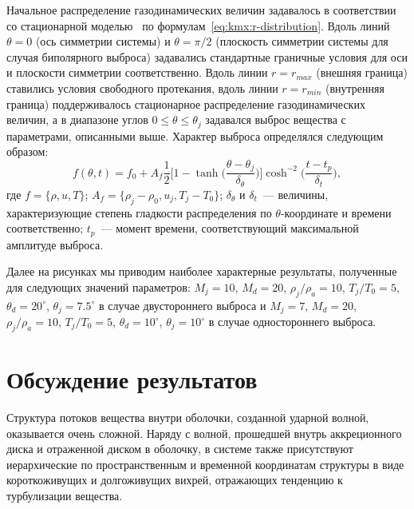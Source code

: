 Начальное распределение газодинамических величин задавалось
в соответствии со стационарной моделью~\cite{kmx:levin-etal-1999} по
формулам~\eqref{eq:kmx:r-distribution}. Вдоль линий ${\theta = 0}$
(ось симметрии системы) и ${\theta = \pi/2}$ (плоскость симметрии
системы для случая биполярного выброса) задавались стандартные граничные
условия для оси и плоскости симметрии соответственно. Вдоль линии
${r = r_{max}}$ (внешняя граница) ставились условия свободного
протекания, вдоль линии ${r = r_{min}}$ (внутренняя граница)
поддерживалось стационарное распределение газодинамических величин,
а в диапазоне углов ${0 \le \theta \le \theta_j}$ задавался выброс
вещества с параметрами, описанными выше. Характер выброса определялся
следующим образом:
\begin{equation*}
f(\theta, t) = f_0 + A_f
\frac{1}{2}
\bigg[1 - \tanh\bigg(\frac{\theta - \theta_j}{\delta_\theta}\bigg)\bigg]
\cosh^{-2}\bigg(\frac{t-t_p}{\delta_t}\bigg),
\end{equation*}
где ${f = \{\rho, u, T\}}$;
${A_f = \{\rho_j - \rho_0, u_j, T_j - T_0\}}$; $\delta_\theta$ и
$\delta_t$~--- величины, характеризующие степень гладкости
распределения по $\theta$-координате и времени соответственно;
$t_p$~--- момент времени, соответствующий максимальной амплитуде
выброса.

Далее на рисунках мы приводим наиболее характерные результаты,
полученные для следующих значений параметров: ${M_j = 10}$,
${M_d = 20}$, ${\rho_j/\rho_a = 10}$, ${T_j / T_0 = 5}$,
${\theta_d = 20^\circ}$, ${\theta_j = 7.5^\circ}$ в случае
двустороннего выброса и ${M_j = 7}$, ${M_d = 20}$,
${\rho_j/\rho_a = 10}$, ${T_j / T_0 = 5}$,
${\theta_d = 10^\circ}$, ${\theta_j = 10^\circ}$ в случае
одностороннего выброса.


\section{Обсуждение результатов}
\label{sect:kmx:discussion}


Структура потоков вещества внутри оболочки, созданной ударной волной,
оказывается очень сложной. Наряду с волной, прошедшей внутрь
аккреционного диска и отраженной диском в оболочку, в системе
также присутствуют иерархические по пространственным и временной
координатам структуры в виде короткоживущих
и долгоживущих вихрей, отражающих тенденцию к турбулизации вещества.

